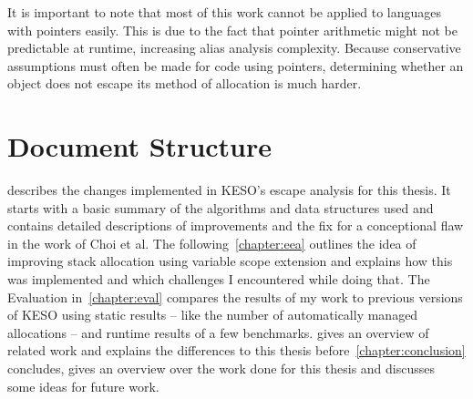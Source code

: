 		It is important to note that most of this work cannot be applied to languages with pointers easily. This is due to
		the fact that pointer arithmetic might not be predictable at runtime, increasing alias analysis complexity. Because
		conservative assumptions must often be made for code using pointers, determining whether an object does not escape
		its method of allocation is much harder.~\cite{horwitz:97:toplas, hind:99:toplas, landi:92:loplas,
		ramalingam:94:toplas}

	\section{Document Structure}
		\label{sec:intro:document-structure}
		 describes the changes implemented in KESO's escape analysis for this thesis. It starts with
		a basic summary of the algorithms and data structures used and contains detailed descriptions of improvements and
		the fix for a conceptional flaw in the work of Choi et al. The following~\cref{chapter:eea} outlines the idea of
		improving stack allocation using variable scope extension and explains how this was implemented and which challenges
		I encountered while doing that. The Evaluation in~\cref{chapter:eval} compares the results of my work to previous
		versions of KESO using static results – like the number of automatically managed allocations – and runtime results
		of a few benchmarks.  gives an overview of related work and explains the differences to this
		thesis before~\cref{chapter:conclusion} concludes, gives an overview over the work done for this thesis and
		discusses some ideas for future work.
